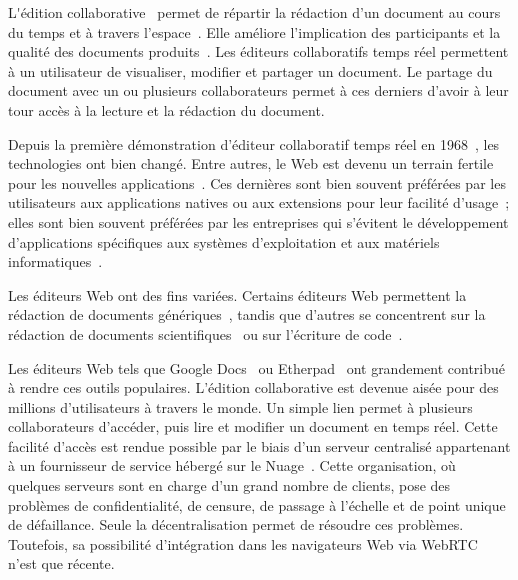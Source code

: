
\lettrine{L}'édition collaborative~\cite{ellis1989concurrency,
  johansen1988groupware} permet de répartir la rédaction d'un document au cours
du temps et à travers l'espace~\cite{desanctis1987foundation,
  grudin1994computersupported, johansen1988groupware}. Elle améliore
l'implication des participants et la qualité des documents
produits~\cite{giles2005internet, noel2004empirical}. Les éditeurs collaboratifs
temps réel permettent à un utilisateur de visualiser, modifier et partager un
document. Le partage du document avec un ou plusieurs collaborateurs permet à
ces derniers d'avoir à leur tour accès à la lecture et la rédaction du document.

Depuis la première démonstration d'éditeur collaboratif temps réel en
1968~\cite{engelbart1968research}, les technologies ont bien changé. Entre
autres, le Web est devenu un terrain fertile pour les nouvelles
applications~\cite{lautamaki2013development}. Ces dernières sont bien souvent
préférées par les utilisateurs aux applications natives ou aux extensions pour
leur facilité d'usage~\cite{mogan2010impact}; elles sont bien souvent préférées
par les entreprises qui s'évitent le développement d'applications spécifiques
aux systèmes d'exploitation et aux matériels
informatiques~\cite{mogan2010impact}.

Les éditeurs Web ont des fins variées.  Certains éditeurs Web permettent la
rédaction de documents génériques~\cite{etherpad, googledocs, googlewave,
  hivejs}, tandis que d'autres se concentrent sur la rédaction de documents
scientifiques~\cite{authorea, overleaf, sharelatex, fidus} ou sur l'écriture de
code~\cite{lautamaki2012cored, hyperdev}.

Les éditeurs Web tels que Google Docs~\cite{googledocs} ou
Etherpad~\cite{etherpad} ont grandement contribué à rendre ces outils
populaires. L'édition collaborative est devenue aisée pour des millions
d'utilisateurs à travers le monde. Un simple lien permet à plusieurs
collaborateurs d'accéder, puis lire et modifier un document en temps réel.
Cette facilité d'accès est rendue possible par le biais d'un serveur centralisé
appartenant à un fournisseur de service hébergé sur le
Nuage~\cite{mell2011national}. Cette organisation, où quelques serveurs sont en
charge d'un grand nombre de clients, pose des problèmes de confidentialité, de
censure, de passage à l'échelle et de point unique de défaillance. Seule la
décentralisation permet de résoudre ces problèmes. Toutefois, sa possibilité
d'intégration dans les navigateurs Web via WebRTC~\cite{webrtc} n'est que
récente.

